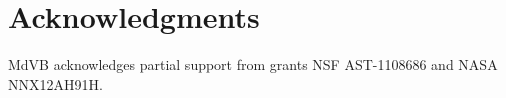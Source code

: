 \documentclass[final,authoryear,5p,times,twocolumn]{elsarticle}
\begin{document}
{{\section{Acknowledgments}


MdVB acknowledges partial support from grants NSF AST-1108686 and NASA
NNX12AH91H.






}}
\end{document}
